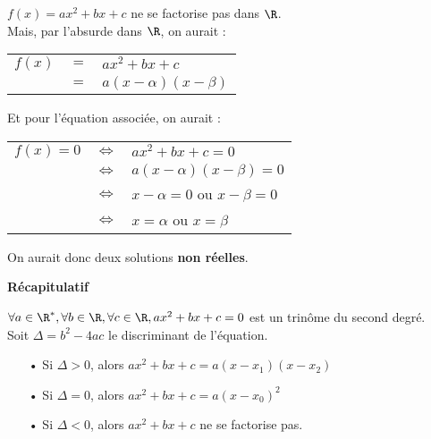 \begin{itemize}
$f\left(x\right) = ax^2 + bx + c$ ne se factorise pas dans $\R$. \\

Mais, par l'absurde dans $\R$, on aurait :

\begin{tabular}{lll}
$f\left(x\right)$ & $=$ & $ax^2 + bx + c$ \\
& $=$ & $a\left(x - \alpha \right)\left(x - \beta\right)$
\end{tabular}

\vspace*{.3cm}

Et pour l'équation associée, on aurait : \\

\begin{tabular}{lll}
$f\left(x\right) = 0$ & $\Longleftrightarrow$ & $ax^2 + bx + c =0$ \\
& $\Longleftrightarrow$ & $a\left(x - \alpha \right)\left(x - \beta\right) = 0$ \\
& $\Longleftrightarrow$ & $x - \alpha = 0 $ ou $x - \beta = 0$ \\
& $\Longleftrightarrow$ & $ x = \alpha $ ou $x = \beta$ \\
\end{tabular}

\vspace*{.3cm}

On aurait donc deux solutions \textbf{non réelles}. 

\newpage

\textbf{Récapitulatif}

$\forall a \in \R^*, \forall b \in \R, \forall c \in \R, ax^2 + bx + c = 0$ est un trinôme du second degré. \\

Soit $\Delta = b^2 - 4ac$ le discriminant de l'équation. \\

\begin{itemize}
\item[•] Si $\Delta > 0$, alors $ax^2 + bx + c = a\left(x-x_1\right)\left(x-x_2\right)$ \\
\item[•] Si $\Delta = 0$, alors $ax^2 + bx + c = a\left(x-x_0\right)^2$\\
\item[•] Si $\Delta < 0$, alors $ax^2 + bx + c $ ne se factorise pas.
\end{itemize}
\end{itemize}

